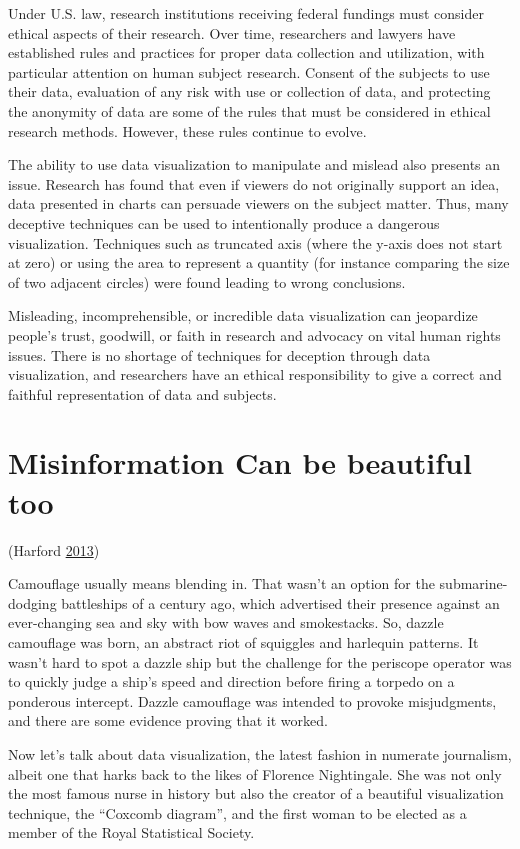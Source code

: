 \documentclass[]{book}
\begin{document}
Under U.S. law, research institutions receiving federal fundings must
consider ethical aspects of their research. Over time, researchers and
lawyers have established rules and practices for proper data collection
and utilization, with particular attention on human subject research.
Consent of the subjects to use their data, evaluation of any risk with
use or collection of data, and protecting the anonymity of data are some
of the rules that must be considered in ethical research methods.
However, these rules continue to evolve.

The ability to use data visualization to manipulate and mislead also
presents an issue. Research has found that even if viewers do not
originally support an idea, data presented in charts can persuade
viewers on the subject matter. Thus, many deceptive techniques can be
used to intentionally produce a dangerous visualization. Techniques such
as truncated axis (where the y-axis does not start at zero) or using the
area to represent a quantity (for instance comparing the size of two
adjacent circles) were found leading to wrong conclusions.

Misleading, incomprehensible, or incredible data visualization can
jeopardize people's trust, goodwill, or faith in research and advocacy
on vital human rights issues. There is no shortage of techniques for
deception through data visualization, and researchers have an ethical
responsibility to give a correct and faithful representation of data and
subjects.

\section{Misinformation Can be beautiful
too}\label{misinformation-can-be-beautiful-too}

(Harford \protect\hyperlink{ref-harford-misinformation}{2013})

Camouflage usually means blending in. That wasn't an option for the
submarine-dodging battleships of a century ago, which advertised their
presence against an ever-changing sea and sky with bow waves and
smokestacks. So, dazzle camouflage was born, an abstract riot of
squiggles and harlequin patterns. It wasn't hard to spot a dazzle ship
but the challenge for the periscope operator was to quickly judge a
ship's speed and direction before firing a torpedo on a ponderous
intercept. Dazzle camouflage was intended to provoke misjudgments, and
there are some evidence proving that it worked.

Now let's talk about data visualization, the latest fashion in numerate
journalism, albeit one that harks back to the likes of Florence
Nightingale. She was not only the most famous nurse in history but also
the creator of a beautiful visualization technique, the ``Coxcomb
diagram'', and the first woman to be elected as a member of the Royal
Statistical Society.
\end{document}
